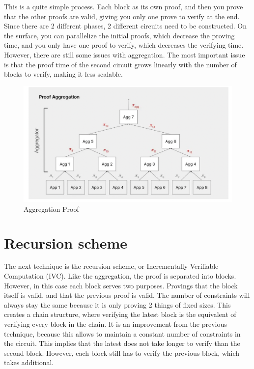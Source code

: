 This is a quite simple process. Each block as its own proof, and then you prove that the other proofs are valid, giving you only one prove
to verify at the end. Since there are 2 different phases, 2 different circuits need to be constructed.
On the surface, you can parallelize the initial proofs, which decrease the proving time, and you only have one proof to verify, which decreases the verifying time.
However, there are still some issues with aggregation. The most important issue is that the proof time of the second circuit grows linearly with the number of blocks to verify, making it less scalable. \cite{Nova23}
\begin{figure}[H]
   \centering
   \includegraphics[width=130mm]{AggregationProof.png}
   \caption{Aggregation Proof \cite{TP24}}
   \label{overflow}
   \end{figure}


\section{Recursion scheme}
The next technique is the recursion scheme, or Incrementally Verifiable Computation (IVC). Like the aggregation, the proof is separated into blocks.
However, in this case each block serves two purposes. Provings that the block itself is valid, and that the previous proof is valid.
The number of constraints will always stay the same because it is only proving 2 things of fixed sizes. This creates
a chain structure, where verifying the latest block is the equivalent of verifying every block in the chain.
It is an improvement from the previous technique, because this allows to maintain a constant number of constraints in the circuit.
This implies that the latest does not take longer to verify than the second block.
However, each block still has to verify the previous block, which takes additional. \cite{Nova23}


